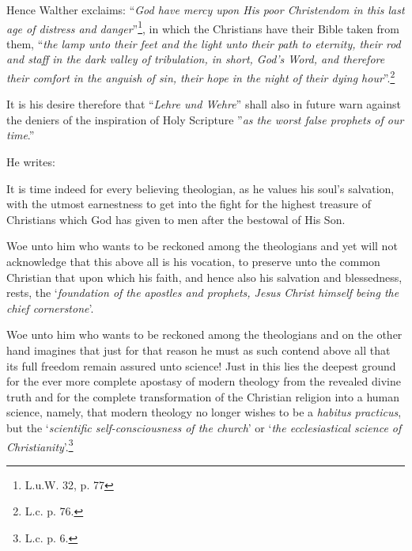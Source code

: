                 Hence Walther exclaims: “\textit{God have mercy upon His poor Christendom in this last age of distress and danger}”\footnote{L.u.W. 32, p. 77}, in which the Christians have their Bible taken from them, “\textit{the lamp unto their feet and the light unto their path to eternity, their rod and staff in the dark valley of tribulation, in short, God’s Word, and therefore their comfort in the anguish of sin, their hope in the night of their dying hour}”.\footnote{L.c. p. 76.}

                It is his desire therefore that “\textit{Lehre und Wehre}” shall also in future warn against the deniers of the inspiration of Holy Scripture ”\textit{as the worst false prophets of our time}.''

                He writes: \begin{fancyquotes}It is time indeed for every believing theologian, as he values his soul’s salvation, with the utmost earnestness to get into the fight for the highest treasure of Christians which God has given to men after the bestowal of His Son.

                Woe unto him who wants to be reckoned among the theologians and yet will not acknowledge that this above all is his vocation, to preserve unto the common Christian that upon which his faith, and hence also his salvation and blessedness, rests, the ‘\textit{foundation of the apostles and prophets, Jesus Christ himself being the chief cornerstone}’. \par Woe unto him who wants to be reckoned among the theologians and on the other hand  imagines that just for that reason he must as such contend above all that its full freedom remain assured unto science!  Just in this lies the deepest ground for the ever more complete apostasy of modern theology from the revealed divine truth and for the complete transformation of the Christian religion into a human science, namely, that modern theology no longer wishes to be a \textit{habitus practicus}, but the ‘\textit{scientific self-consciousness of the church}’ or ‘\textit{the ecclesiastical science of Christianity}’.\footnote{L.c. p. 6.}\end{fancyquotes}

